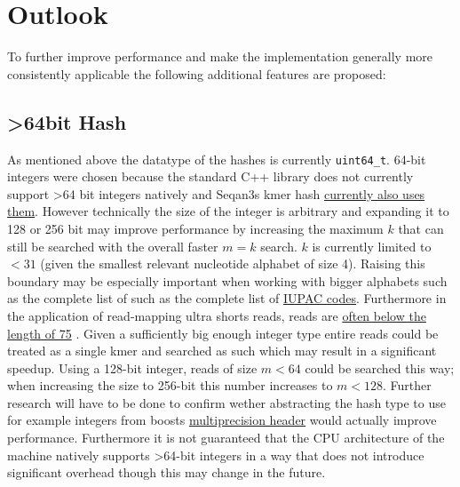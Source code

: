 \chapter{Outlook}

To further improve performance and make the implementation generally
more consistently applicable the following additional features are proposed:

\section{>64bit Hash}
As mentioned above the datatype of the hashes is currently \lstinline{uint64_t}.
64-bit integers were chosen because the standard C++ library does
not currently support >64 bit integers natively and Seqan3s kmer hash \href{http://docs.seqan.de/seqan/3-master-user/group__views.html\#ga6e598d6a021868f704d39df73252974f}{currently also uses them}.
However technically the size of the integer is arbitrary and expanding it to 128 or 256 bit may improve performance
by increasing the maximum $k$ that can still be searched with the overall faster $m=k$ search. $k$ is currently
limited to $<31$ (given the smallest relevant nucleotide alphabet of size 4). Raising this boundary
may be especially important when working with bigger alphabets such as the complete list of such as the complete list of
\href{https://www.bioinformatics.org/sms/iupac.html}{IUPAC codes}. Furthermore in the application
of read-mapping ultra shorts reads, reads are \href{https://www.illumina.com/science/technology/next-generation-sequencing/plan-experiments/read-length.html}{often below the length of 75}
. Given a sufficiently big enough integer type entire reads could be treated as a single kmer and searched as such which
may result in a significant speedup. Using a 128-bit integer, reads of size $m<64$ could be searched this way;
when increasing the size to 256-bit this number increases to $m<128$. Further research will have to be done to confirm wether abstracting the hash type to use for example
integers from boosts \href{https://www.boost.org/doc/libs/1_62_0/libs/multiprecision/doc/html/boost_multiprecision/tut/ints/cpp_int.html}{multiprecision header}
would actually improve performance. Furthermore it is not guaranteed that the CPU architecture of the machine
natively supports >64-bit integers in a way that does not introduce significant overhead though this may change in the future.

